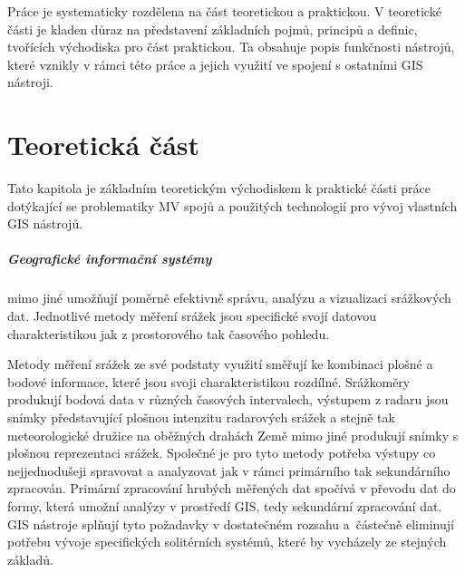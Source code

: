 \documentclass[a4paper,12pt,oneside]{report}
\begin{document}
Práce je systematicky rozdělena na část teoretickou a praktickou. V
teoretické části je kladen důraz na představení základních pojmů,
principů a definic, tvořících východiska pro část praktickou. Ta
obsahuje popis funkčnosti nástrojů, které vznikly v rámci této práce a
 jejich využití ve spojení s ostatními GIS nástroji.

 



\newpage
\chapter*{Teoretická
  část}

Tato kapitola je základním teoretickým východiskem k praktické části
práce dotýkající se problematiky MV spojů a použitých technologií pro
vývoj vlastních GIS nástrojů.

\paragraph*{Geografické informační systémy} mimo jiné umožňují poměrně
efektivně  správu, analýzu a vizualizaci sráž\-kových dat. 
Jednotlivé metody měření srážek jsou specifické svojí
datovou charakteristikou jak z prostorového tak časového pohledu.

Metody měření srážek ze své podstaty využití směřují ke kombinaci
plošné a bodové informace, které jsou svoji charakteristikou
rozdílné. Srážkoměry produkují bodová data v různých časových
intervalech, výstupem z radaru jsou snímky představující plošnou
intenzitu radarových srážek a stejně tak meteorologické družice na oběžných drahách Země
mimo jiné produkují  snímky s plošnou reprezentaci srážek. 
Společné je pro tyto metody
potřeba výstupy co nejjednodušeji spravovat a analyzovat jak v rámci
primárního tak sekundá\-rního zpracován. Primární zpracování hrubých měřených dat spočívá v převodu dat do formy, která umožní analýzy v prostředí GIS, tedy sekundární zpracování dat.
GIS nástroje splňují tyto
požadavky v dostatečném rozsahu a~částečně eliminují potřebu vývoje
specifických solitérních systémů, které by vychá\-zely ze stejných
základů.
\end{document}
